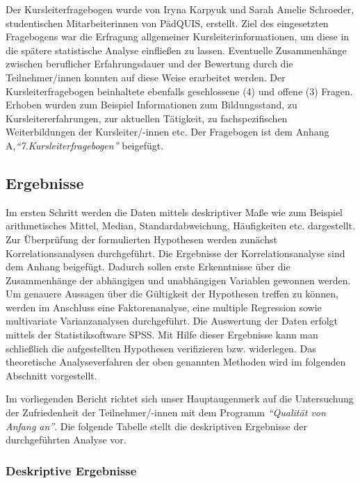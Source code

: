 \documentclass[12pt,a4paper]{article}
\begin{document}
Der Kursleiterfragebogen wurde von Iryna Karpyuk und Sarah Amelie Schroeder, studentischen Mitarbeiterinnen von PädQUIS, erstellt. Ziel des eingesetzten Fragebogens war die Erfragung allgemeiner Kursleiterinformationen, um diese in die spätere statistische Analyse einfließen zu lassen. Eventuelle Zusammenhänge zwischen beruflicher Erfahrungsdauer und der Bewertung durch die Teilnehmer/innen konnten auf diese Weise erarbeitet werden. Der Kursleiterfragebogen beinhaltete ebenfalls geschlossene (4) und offene (3) Fragen. Erhoben wurden zum Beispiel Informationen zum Bildungsstand, zu Kursleitererfahrungen, zur aktuellen Tätigkeit, zu fachspezifischen Weiterbildungen der Kursleiter/-innen etc. Der Fragebogen ist dem Anhang A,\textit{"`7.Kursleiterfragebogen"'} beigefügt.


\subsection{Ergebnisse}

Im ersten Schritt werden die Daten mittels deskriptiver Maße wie zum Beispiel arithmetisches Mittel, Median, Standardabweichung, Häufigkeiten etc. dar\-ge\-stellt. Zur Überprüfung der formulierten Hypothesen werden zunächst Korrelationsanalysen durchgeführt. Die Ergebnisse der Korrelationsanalyse sind dem Anhang beigefügt. Dadurch sollen erste Erkenntnisse über die Zusammenhänge der abhängigen und unabhängigen Variablen gewonnen werden. Um genauere Aussagen über die Gültigkeit der Hypothesen treffen zu können, werden im Anschluss eine Faktorenanalyse, eine multiple Regression sowie multivariate Varianzanalysen durchgeführt. Die Auswertung der Daten erfolgt mittels der Statistiksoftware SPSS. Mit Hilfe dieser Ergebnisse kann man schließlich die aufgestellten Hypothesen verifizieren bzw. widerlegen. Das theoretische Analyseverfahren der oben genannten Methoden wird im folgenden Abschnitt vorgestellt. 

Im vorliegenden Bericht richtet sich unser Hauptaugenmerk auf die Untersuchung der Zufriedenheit der Teilnehmer/-innen mit dem Programm \textit{"`Qualität von Anfang an"'}. Die folgende Tabelle stellt die deskriptiven Ergebnisse der durchgeführten Analyse vor. 

\subsubsection{Deskriptive Ergebnisse}
\end{document}
